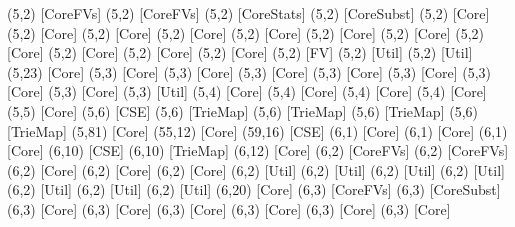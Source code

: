 {(5,2) [CoreFVs] %
(5,2) [CoreFVs] %
(5,2) [CoreStats] %
(5,2) [CoreSubst] %
(5,2) [Core] %
(5,2) [Core] %
(5,2) [Core] %
(5,2) [Core] %
(5,2) [Core] %
(5,2) [Core] %
(5,2) [Core] %
(5,2) [Core] %
(5,2) [Core] %
(5,2) [Core] %
(5,2) [Core] %
(5,2) [FV] %
(5,2) [Util] %
(5,2) [Util] %
(5,23) [Core] %
(5,3) [Core] %
(5,3) [Core] %
(5,3) [Core] %
(5,3) [Core] %
(5,3) [Core] %
(5,3) [Core] %
(5,3) [Core] %
(5,3) [Util] %
(5,4) [Core] %
(5,4) [Core] %
(5,4) [Core] %
(5,4) [Core] %
(5,5) [Core] %
(5,6) [CSE] %
(5,6) [TrieMap] %
(5,6) [TrieMap] %
(5,6) [TrieMap] %
(5,6) [TrieMap] %
(5,81) [Core] %
(55,12) [Core] %
(59,16) [CSE] %
(6,1) [Core] %
(6,1) [Core] %
(6,1) [Core] %
(6,10) [CSE] %
(6,10) [TrieMap] %
(6,12) [Core] %
(6,2) [CoreFVs] %
(6,2) [CoreFVs] %
(6,2) [Core] %
(6,2) [Core] %
(6,2) [Core] %
(6,2) [Util] %
(6,2) [Util] %
(6,2) [Util] %
(6,2) [Util] %
(6,2) [Util] %
(6,2) [Util] %
(6,2) [Util] %
(6,20) [Core] %
(6,3) [CoreFVs] %
(6,3) [CoreSubst] %
(6,3) [Core] %
(6,3) [Core] %
(6,3) [Core] %
(6,3) [Core] %
(6,3) [Core] %
(6,3) [Core] %
}
